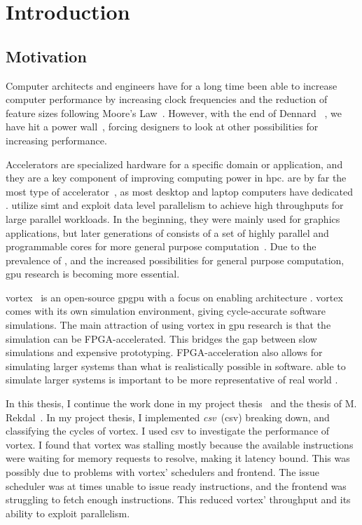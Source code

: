 \chapter{Introduction}

\section{Motivation}

Computer architects and engineers have for a long time been able to increase computer performance by increasing clock frequencies and the reduction of feature sizes following Moore's Law~\cite{moore}. However, with the end of Dennard ~\cite{dennard_scaling}, we have hit a power wall~\cite{powerwall}, forcing designers to look at other possibilities for increasing performance. 

Accelerators are specialized hardware for a specific domain or application, and they are a key component of improving computing power in \acrfull{hpc}.  are by far the most  type of accelerator~\cite{gpu_trends}, as most desktop and laptop computers have dedicated .  utilize \acrshort{simt} and exploit data level parallelism to achieve high throughputs for large parallel workloads. In the beginning, they were mainly used for graphics applications, but later generations of  consists of a set of highly parallel and programmable cores for more general purpose computation~\cite{gpu_history}. Due to the prevalence of , and the increased possibilities for general purpose computation, \acrshort{gpu} research is becoming more essential.

\Gls{vortex}~\cite{vortex} is an open-source \acrshort{gpgpu} with a focus on enabling architecture . \Gls{vortex} comes with its own simulation environment, giving cycle-accurate software simulations. The main attraction of using \Gls{vortex} in \acrshort{gpu} research is that the simulation can be FPGA-accelerated. This bridges the gap between slow  simulations and expensive prototyping. FPGA-acceleration also allows for simulating larger systems than what is realistically possible in software.  able to simulate larger systems is important to be more representative of real world .

In this thesis, I continue the work done in my project thesis~\cite{Aurud_Project} and the  thesis of M. Rekdal~\cite{Rekdal_Master}. In my project thesis, I implemented \textit{\acrlong{csv}}~(\acrshort{csv}) breaking down, and classifying the cycles of \Gls{vortex}. I used \acrshort{csv} to  investigate the performance of \Gls{vortex}. I found that \Gls{vortex} was stalling mostly because the available instructions were waiting for memory requests to resolve, making it latency bound. This was possibly due to problems with \Gls{vortex}' schedulers and frontend. The issue scheduler was at times unable to issue ready instructions, and the frontend was struggling to fetch enough instructions. This reduced \Gls{vortex}' throughput and its ability to exploit parallelism. 

